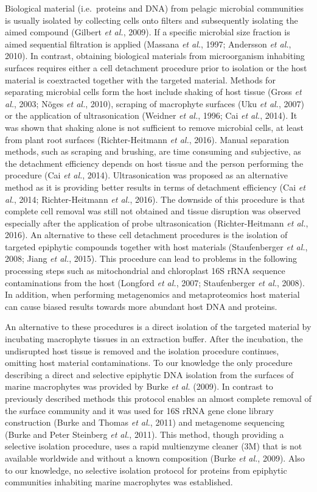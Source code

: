 \documentclass[12pt,]{article}
\begin{document}
Biological material (i.e.~proteins and DNA) from pelagic microbial
communities is usually isolated by collecting cells onto filters and
subsequently isolating the aimed compound (Gilbert \emph{et al.}, 2009).
If a specific microbial size fraction is aimed sequential filtration is
applied (Massana \emph{et al.}, 1997; Andersson \emph{et al.}, 2010). In
contrast, obtaining biological materials from microorganism inhabiting
surfaces requires either a cell detachment procedure prior to isolation
or the host material is coextracted together with the targeted material.
Methods for separating microbial cells form the host include shaking of
host tissue (Gross \emph{et al.}, 2003; Nõges \emph{et al.}, 2010),
scraping of macrophyte surfaces (Uku \emph{et al.}, 2007) or the
application of ultrasonication (Weidner \emph{et al.}, 1996; Cai
\emph{et al.}, 2014). It was shown that shaking alone is not sufficient
to remove microbial cells, at least from plant root surfaces
(Richter-Heitmann \emph{et al.}, 2016). Manual separation methods, such
as scraping and brushing, are time consuming and subjective, as the
detachment efficiency depends on host tissue and the person performing
the procedure (Cai \emph{et al.}, 2014). Ultrasonication was proposed as
an alternative method as it is providing better results in terms of
detachment efficiency (Cai \emph{et al.}, 2014; Richter-Heitmann
\emph{et al.}, 2016). The downside of this procedure is that complete
cell removal was still not obtained and tissue disruption was observed
especially after the application of probe ultrasonication
(Richter-Heitmann \emph{et al.}, 2016). An alternative to these cell
detachment procedures is the isolation of targeted epiphytic compounds
together with host materials (Staufenberger \emph{et al.}, 2008; Jiang
\emph{et al.}, 2015). This procedure can lead to problems in the
following processing steps such as mitochondrial and chloroplast 16S
rRNA sequence contaminations from the host (Longford \emph{et al.},
2007; Staufenberger \emph{et al.}, 2008). In addition, when performing
metagenomics and metaproteomics host material can cause biased results
towards more abundant host DNA and proteins.

An alternative to these procedures is a direct isolation of the targeted
material by incubating macrophyte tissues in an extraction buffer. After
the incubation, the undisrupted host tissue is removed and the isolation
procedure continues, omitting host material contaminations. To our
knowledge the only procedure describing a direct and selective epiphytic
DNA isolation from the surfaces of marine macrophytes was provided by
Burke \emph{et al.} (2009). In contrast to previously described methods
this protocol enables an almost complete removal of the surface
community and it was used for 16S rRNA gene clone library construction
(Burke and Thomas \emph{et al.}, 2011) and metagenome sequencing (Burke
and Peter Steinberg \emph{et al.}, 2011). This method, though providing
a selective isolation procedure, uses a rapid multienzyme cleaner (3M)
that is not available worldwide and without a known composition (Burke
\emph{et al.}, 2009). Also to our knowledge, no selective isolation
protocol for proteins from epiphytic communities inhabiting marine
macrophytes was established.
\end{document}
